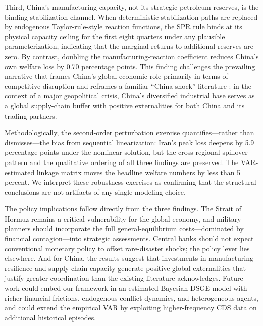 \documentclass[12pt,a4paper]{article}
\begin{document}
Third, China's manufacturing capacity, not its strategic petroleum reserves, is the binding stabilization channel. When deterministic stabilization paths are replaced by endogenous Taylor-rule-style reaction functions, the SPR rule binds at its physical capacity ceiling for the first eight quarters under any plausible parameterization, indicating that the marginal returns to additional reserves are zero. By contrast, doubling the manufacturing-reaction coefficient reduces China's own welfare loss by 0.70 percentage points. This finding challenges the prevailing narrative that frames China's global economic role primarily in terms of competitive disruption and reframes a familiar ``China shock'' literature \citep{autor2013china}: in the context of a major geopolitical crisis, China's diversified industrial base serves as a global supply-chain buffer with positive externalities for both China and its trading partners.

Methodologically, the second-order perturbation exercise quantifies---rather than dismisses---the bias from sequential linearization: Iran's peak loss deepens by 5.9 percentage points under the nonlinear solution, but the cross-regional spillover pattern and the qualitative ordering of all three findings are preserved. The VAR-estimated linkage matrix moves the headline welfare numbers by less than 5 percent. We interpret these robustness exercises as confirming that the structural conclusions are not artifacts of any single modeling choice.

The policy implications follow directly from the three findings. The Strait of Hormuz remains a critical vulnerability for the global economy, and military planners should incorporate the full general-equilibrium costs---dominated by financial contagion---into strategic assessments. Central banks should not expect conventional monetary policy to offset rare-disaster shocks; the policy lever lies elsewhere. And for China, the results suggest that investments in manufacturing resilience and supply-chain capacity generate positive global externalities that justify greater coordination than the existing literature acknowledges. Future work could embed our framework in an estimated Bayesian DSGE model with richer financial frictions, endogenous conflict dynamics, and heterogeneous agents, and could extend the empirical VAR by exploiting higher-frequency CDS data on additional historical episodes.


\end{document}
